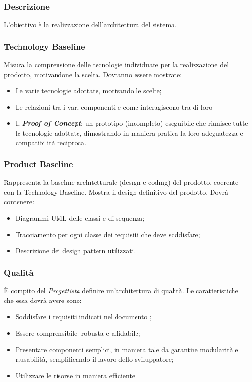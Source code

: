 \subsubsection{Descrizione}
L’obiettivo è la realizzazione dell’architettura del sistema.

\subsubsection{Technology Baseline}
Misura la comprensione delle tecnologie individuate per la realizzazione del prodotto, motivandone la scelta. 
Dovranno essere mostrate:
\begin{itemize}
	\item Le varie tecnologie adottate, motivando le scelte;
	\item Le relazioni tra i vari componenti e come interagiscono tra di loro;
	\item Il \textit{\textbf{Proof of Concept}}: un prototipo (incompleto) eseguibile che riunisce tutte le tecnologie adottate, dimostrando in maniera pratica la loro adeguatezza e compatibilità reciproca. 
\end{itemize}

\subsubsection{Product Baseline}
Rappresenta la baseline architetturale (design e coding) del prodotto, coerente con la Technology Baseline. Mostra il design definitivo del prodotto.
Dovrà contenere:
\begin{itemize}
	\item Diagrammi UML delle classi e di sequenza;
	\item Tracciamento per ogni classe dei requisiti che deve soddisfare;
	\item Descrizione dei design pattern utilizzati.
\end{itemize}

\subsubsection{Qualità}
È compito del \textit{Progettista} definire un'architettura di qualità. Le caratteristiche che essa dovrà avere sono:
\begin{itemize}
  \item Soddisfare i requisiti indicati nel documento \AdR;
  \item Essere comprensibile, robusta e affidabile;
  \item Presentare componenti semplici, in maniera tale da garantire modularità e riusabilità, semplificando il lavoro dello sviluppatore;
  \item Utilizzare le risorse in maniera efficiente.
\end{itemize}

